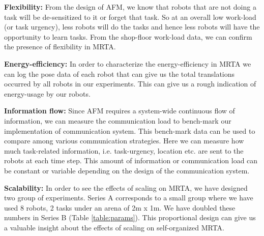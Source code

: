 \documentclass[smallcondensed]{svjour3}
\begin{document}
\textbf{Flexibility:} From the design of AFM, we know that robots that are not doing a task will be de-sensitized to it or forget that task. So at an overall low work-load (or task urgency), less robots will do the tasks and hence less robots will have the opportunity to learn tasks. From the shop-floor work-load data, we can confirm the presence of flexibility in MRTA.

\textbf{Energy-efficiency:} In order to characterize the energy-efficiency in MRTA we can log the pose data of each robot that can give us the total translations occurred by all robots in our experiments. This can give us a rough indication of energy-usage by our robots. 

\textbf{Information flow:} Since AFM requires a system-wide continuous flow of information, we can measure the communication load to bench-mark our implementation of communication system. This bench-mark data can be used to compare among various communication strategies. Here we can measure  how much task-related information, i.e. task-urgency, location etc. are sent to the robots at each time step. This  amount of information or communication load can be constant or variable depending on the design of the communication system.

\textbf{Scalability:} In order to see the effects of scaling on MRTA, we have designed two group of experiments. Series A corresponds to a small group where we have used 8 robots, 2 tasks under an arena of 2m x 1m. We have doubled these numbers in Series B (Table \ref{table:params}). This proportional design can give us a valuable insight about the effects of scaling on self-organized MRTA. 
\end{document}
